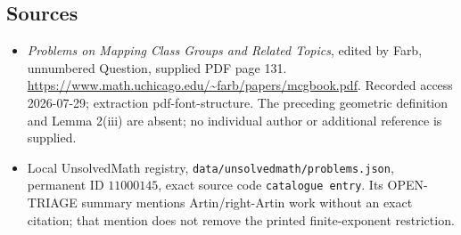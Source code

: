 \documentclass[11pt]{article}
\begin{document}
\subsection{Sources}
\begin{itemize}
\item \emph{Problems on Mapping Class Groups and Related Topics}, edited by Farb, unnumbered Question, supplied PDF page 131. \url{https://www.math.uchicago.edu/~farb/papers/mcgbook.pdf}. Recorded access 2026-07-29; extraction pdf-font-structure. The preceding geometric definition and Lemma 2(iii) are absent; no individual author or additional reference is supplied.
\item Local UnsolvedMath registry, \texttt{data/unsolvedmath/problems.json}, permanent ID \(11000145\), exact source code \texttt{catalogue entry}. Its OPEN-TRIAGE summary mentions Artin/right-Artin work without an exact citation; that mention does not remove the printed finite-exponent restriction.
\end{itemize}
\end{document}
